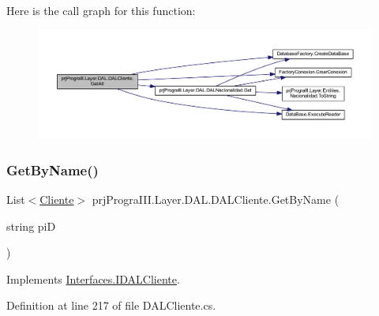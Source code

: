 Here is the call graph for this function\+:
\nopagebreak
\begin{figure}[H]
\begin{center}
\leavevmode
\includegraphics[width=350pt]{classprj_progra_i_i_i_1_1_layer_1_1_d_a_l_1_1_d_a_l_cliente_a7c513194970afd18572e1b93bb8ba4d9_cgraph}
\end{center}
\end{figure}
\hypertarget{classprj_progra_i_i_i_1_1_layer_1_1_d_a_l_1_1_d_a_l_cliente_ad65a26a4c49f914716a21169e79815c8}{}\label{classprj_progra_i_i_i_1_1_layer_1_1_d_a_l_1_1_d_a_l_cliente_ad65a26a4c49f914716a21169e79815c8} 
\subsubsection{\texorpdfstring{Get\+By\+Name()}{GetByName()}}
{\footnotesize\ttfamily List$<$\hyperlink{classprj_progra_i_i_i_1_1_layer_1_1_entities_1_1_cliente}{Cliente}$>$ prj\+Progra\+I\+I\+I.\+Layer.\+D\+A\+L.\+D\+A\+L\+Cliente.\+Get\+By\+Name (\begin{DoxyParamCaption}\item[{string}]{piD }\end{DoxyParamCaption})}



Implements \hyperlink{interface_interfaces_1_1_i_d_a_l_cliente_a11ca3e48a2e757780fd59a2bd85e522f}{Interfaces.\+I\+D\+A\+L\+Cliente}.



Definition at line 217 of file D\+A\+L\+Cliente.\+cs.

